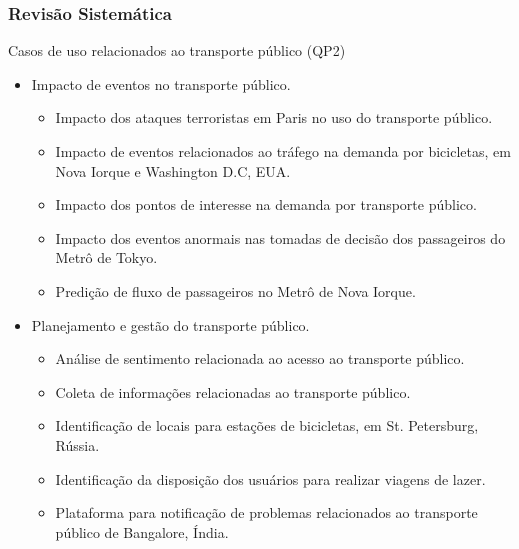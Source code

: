 \documentclass{beamer}
\begin{document}
\begin{frame}
\frametitle{Revisão Sistemática}
\begin{block}{Casos de uso relacionados ao transporte público (QP2)}
\begin{itemize}
\item Impacto de eventos no transporte público.
\begin{itemize}
\item Impacto dos ataques terroristas em Paris no uso do transporte público.
\item Impacto de eventos relacionados ao tráfego na demanda por bicicletas, em Nova Iorque e Washington D.C, EUA.
\item Impacto dos pontos de interesse na demanda por transporte público.
\item Impacto dos eventos anormais nas tomadas de decisão dos passageiros do Metrô de Tokyo.
\item Predição de fluxo de passageiros no Metrô de Nova Iorque.
\end{itemize}

\item Planejamento e gestão do transporte público.
\begin{itemize}
\item Análise de sentimento relacionada ao acesso ao transporte público.
\item Coleta de informações relacionadas ao transporte público.
\item Identificação de locais para estações de bicicletas, em St. Petersburg, Rússia.
\item Identificação da disposição dos usuários para realizar viagens de lazer.
\item Plataforma para notificação de problemas relacionados ao transporte público de Bangalore, Índia.
\end{itemize}
\end{itemize}
\end{block}

\end{frame}
\end{document}
